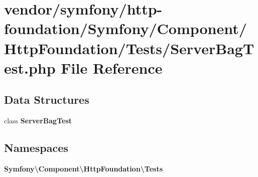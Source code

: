 \section{vendor/symfony/http-\/foundation/\+Symfony/\+Component/\+Http\+Foundation/\+Tests/\+Server\+Bag\+Test.php File Reference}
\label{_server_bag_test_8php}
\subsection*{Data Structures}
\begin{DoxyCompactItemize}
\item 
class {\bf Server\+Bag\+Test}
\end{DoxyCompactItemize}
\subsection*{Namespaces}
\begin{DoxyCompactItemize}
\item 
 {\bf Symfony\textbackslash{}\+Component\textbackslash{}\+Http\+Foundation\textbackslash{}\+Tests}
\end{DoxyCompactItemize}
